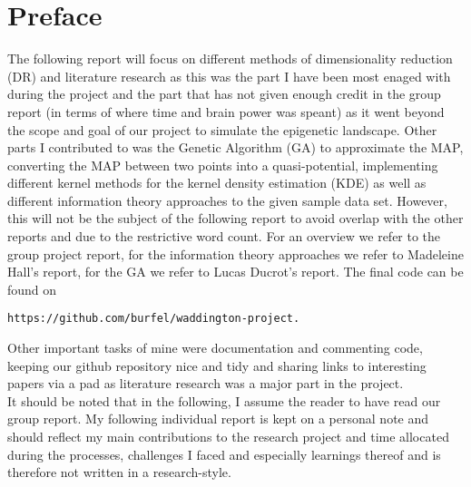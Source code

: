 \documentclass[journal, a4paper]{IEEEtran}
\begin{document}
\section{Preface}
The following report will focus on different methods of dimensionality reduction (DR) and literature research as this was the part I have been most enaged with during the project and the part that has not given enough credit in the group report (in terms of where time and brain power was speant) as it went beyond the scope and goal of our project to simulate the epigenetic landscape.
Other parts I contributed to was the Genetic Algorithm (GA) to approximate the MAP, converting the MAP between two points into a quasi-potential, implementing different kernel methods for the kernel density estimation (KDE) as well as different information theory approaches to the given sample data set. However, this will not be the subject of the following report to avoid overlap with the other reports and due to the restrictive word count. For an overview we refer to the group project report, for the information theory approaches we refer to Madeleine Hall's report, for the GA we refer to Lucas Ducrot's report. The final code can be found on \begin{verbatim}
https://github.com/burfel/waddington-project.
\end{verbatim}	
Other important tasks of mine were documentation and commenting code, keeping our github repository nice and tidy and sharing links to interesting papers via a pad as literature research was a major part in the project. \\

It should be noted that in the following, I assume the reader to have read our group report. My following individual report is kept on a personal note and should reflect my main contributions to the research project and time allocated during the processes, challenges I faced and especially learnings thereof and is therefore not written in a research-style. 


	

\end{document}
